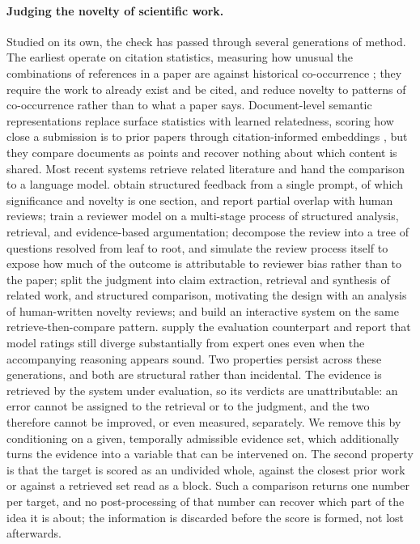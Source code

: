 \paragraph{Judging the novelty of scientific work.} Studied on its own, the
check has passed through several generations of method. The earliest operate on
citation statistics, measuring how unusual the combinations of references in a
paper are against historical co-occurrence \citep{uzzi2013atypical}; they
require the work to already exist and be cited, and reduce novelty to patterns
of co-occurrence rather than to what a paper says. Document-level semantic
representations replace surface statistics with learned relatedness, scoring how
close a submission is to prior papers through citation-informed embeddings
\citep{cohan2020specter,ostendorff2022scincl}, but they compare documents as
points and recover nothing about which content is shared. Most recent systems
retrieve related literature and hand the comparison to a language model.
\citet{liang2024llmfeedback} obtain structured feedback from a single prompt, of
which significance and novelty is one section, and report partial overlap with
human reviews; \citet{zhu2025deepreview} train a
reviewer model on a multi-stage process of structured analysis, retrieval, and
evidence-based argumentation; \citet{chang2025treereview} decompose the review
into a tree of questions resolved from leaf to root, and
\citet{jin2024agentreview} simulate the review process itself to expose how
much of the outcome is attributable to reviewer bias rather than to the paper;
\citet{afzal2026beyond} split the judgment into
claim extraction, retrieval and synthesis of related work, and structured
comparison, motivating the design with an analysis of human-written novelty
reviews; and \citet{dasilva2025graphmind} build an interactive system on the
same retrieve-then-compare pattern. \citet{schopf2026rinobench} supply the
evaluation counterpart and report that model ratings still diverge substantially
from expert ones even when the accompanying reasoning appears sound. Two
properties persist across these generations, and both are structural rather
than incidental. The evidence is retrieved by the system under evaluation, so
its verdicts are unattributable: an error cannot be assigned to the retrieval or
to the judgment, and the two therefore cannot be improved, or even measured,
separately. We remove this by conditioning on a given, temporally admissible
evidence set, which additionally turns the evidence into a variable that can be
intervened on. The second property is that the target is scored as an undivided
whole, against the closest prior work or against a retrieved set read as a
block. Such a comparison returns one number per target, and no post-processing
of that number can recover which part of the idea it is about; the information
is discarded before the score is formed, not lost afterwards.

